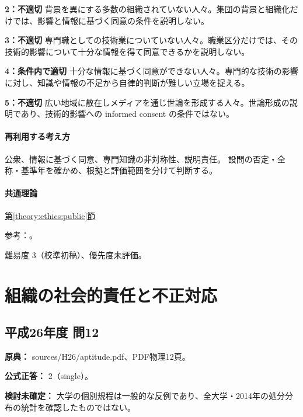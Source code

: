 \noindent\textbf{2：不適切} 背景を異にする多数の組織されていない人々。集団の背景と組織化だけでは、影響と情報に基づく同意の条件を説明しない。\par

\noindent\textbf{3：不適切} 専門職としての技術業についていない人々。職業区分だけでは、その技術的影響について十分な情報を得て同意できるかを説明しない。\par

\noindent\textbf{4：条件内で適切} 十分な情報に基づく同意ができない人々。専門的な技術の影響に対し、知識や情報の不足から自律的判断が難しい立場を捉える。\par

\noindent\textbf{5：不適切} 広い地域に散在しメディアを通じ世論を形成する人々。世論形成の説明であり、技術的影響への informed consent の条件ではない。\par

\paragraph{再利用する考え方} 公衆、情報に基づく同意、専門知識の非対称性、説明責任。 設問の否定・全称・基準年を確かめ、根拠と評価範囲を分けて判断する。

\paragraph{共通理論} \hyperref[theory:ethics:public]{第\ref*{theory:ethics:public}節}

\par 参考：\cite{scu_ethics_framework,ipej_ethics2011}。

\par 難易度 3（校準初稿）、優先度未評価。

\section{組織の社会的責任と不正対応}

\subsection{平成26年度 問12}
\label{q:h26-reg-apt-12}

\noindent\textbf{原典：} sources/H26/aptitude.pdf、PDF物理12頁。

\textbf{公式正答：} 2（single）。

\par\textbf{検討未確定：} 大学の個別規程は一般的な反例であり、全大学・2014年の処分分布の統計を確認したものではない。

